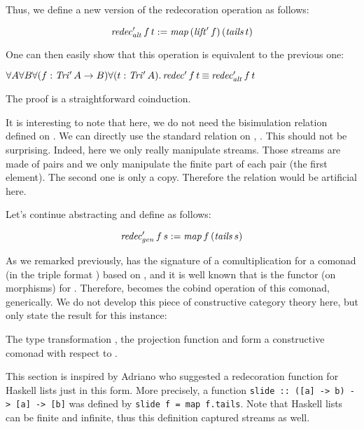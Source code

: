 Thus, we define a new version of the redecoration operation as
follows:
\begin{definition}
  $$\mathit{redec'_{alt}}\,f\,t := \mathit{map}\,(\mathit{lift'}\,f)\,(\mathit{tails}\,t)$$
\end{definition}
\noindent
One can then easily show that this operation is equivalent to the
previous one: 
\begin{lemma}
  $\forall A\forall B\forall (f: \mathit{Tri'}\,A \to B)\forall (t:
  \mathit{Tri'}\,A).\, \mathit{redec'}\,f\,t \mathbin{\equiv} \mathit{redec'_{alt}}\,f\,t$
\end{lemma}
The proof is a straightforward coinduction. 

It is interesting to note that here, we do not need the bisimulation
relation defined on \TriS{}. We can directly use the standard relation
on \Str{}, \EqSt{}. This should not be surprising. Indeed, here we
only really manipulate streams. Those streams are made of pairs and we
only manipulate the finite part of each pair (the first element). The
second one is only a copy. Therefore the relation \bisimS{} would be
artificial here. 

Let's continue abstracting and define \redecSG{} as follows:
\begin{definition}
  $$\mathit{redec'_{gen}}\,f\,s :=  \mathit{map}\,f\,(\mathit{tails}\,s)$$
\end{definition}
\noindent
As we remarked previously, \tls{} has the signature of a
comultiplication for a comonad (in the triple format \cite{maclane}) based on \Str{},
and it is well known that \map{} is the functor (on morphisms) for
\Str{}. Therefore, \redecSG{} becomes the cobind operation of this
comonad, generically. We do not develop this piece of constructive
category theory here, but only state the result for this instance:
\begin{lemma}\label{lemma:StrComonad}
  The type transformation \Str{}, the projection function \hd{} and
  \redecSG{} form a constructive comonad with respect to \EqSt{}.
\end{lemma}

This section is inspired by Adriano
\cite{haskellList:redecorationAnswer}
who suggested 
a redecoration function for Haskell lists just
in this form. More precisely, a function \texttt{slide :: ([a] -> b) -> [a] ->
  [b]} was defined by \texttt{slide f = map f.tails}. Note that Haskell
lists can be finite and infinite, thus this definition captured
streams as well.

